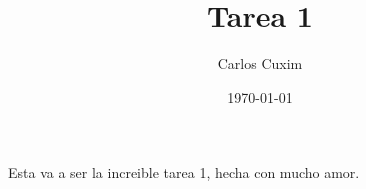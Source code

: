 \documentclass[11pt]{article}
\title{Tarea 1}
\author{Carlos Cuxim}
\date{\today}
\begin{document}
\maketitle

Esta va a ser la increible tarea 1, hecha con mucho amor.
\end{document}
